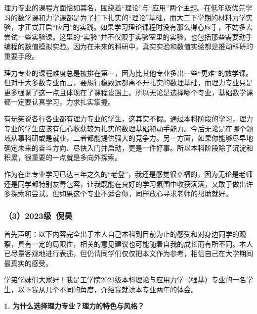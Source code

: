 \vspace{10pt}

理力专业的课程方面恰如其名，围绕着“理论”与“应用”两个主题。在低年级优先学习的数学课和力学课都是为了打下扎实的“理论”基础，而大二下学期的材料力学实验，才正式开启“应用”的实践。如果学习理论课程时没有那么得心应手，不妨多去尝试一些实验课。这里的“实验”并不仅限于实验室里的实验，也包括那些需要动手编程的数值模拟实验。因为在未来的科研中，真实实验和数值实验都是推动科研的重要手段。

\vspace{10pt}

理力专业的课程难度总是被排在第一，因为比其他专业多出一些“更难”的数学课。但对于大多数专业而言，要想行稳致远都离不开扎实的数理基础，而理力专业只是更多强调了这一点且体现在了课程设置上。所以无论是选择哪个专业，基础数学课都一定要认真学习，力求扎实掌握。

\vspace{10pt}

有玩笑说各行各业都有理力专业的学生，这其实不假。通过本科阶段的学习，理力专业的学生应该有信心收获较为扎实的数理基础和动手能力。今后无论是在哪个领域从事科研或是就业，二者都能提供强大的竞争力。另一方面，如果你能够尽早地确定未来的奋斗方向、尽快入门并启动，更是一件好事。所以本科阶段除了沉淀和积累，很重要的一点就是多向外探索。

\vspace{10pt}

作为在此专业学习已达三年之久的“老登”，我还是感觉很幸福的，因为无论是老师还是同学都特别友善包容，让我既能在良好的学习氛围中收获满满，又敢于做出许多探索和尝试。但如果这个专业不适合你，同样放心寻求老师的帮助就好。

\subsubsection{（3）2023级\ 倪昊}

首先声明：以下内容完全出于本人自己本科到目前为止的感受和对身边同学的观察，具有一定的局限性，相关的意见建议也可能随着自我的成长而有所不同。本人已尽量客观地进行表述，但仍请同学们仅仅把本文作为参考，相信自己在大学期间最真实的感受。

\vspace{10pt}

学弟学妹们大家好！我是工学院2023级本科理论与应用力学（强基）专业的一名学生，以下我从几个不同的角度，介绍我就读本专业两年的体会。

\vspace{10pt}

\textbf{1. 为什么选择理力专业？理力的特色与风格？}

